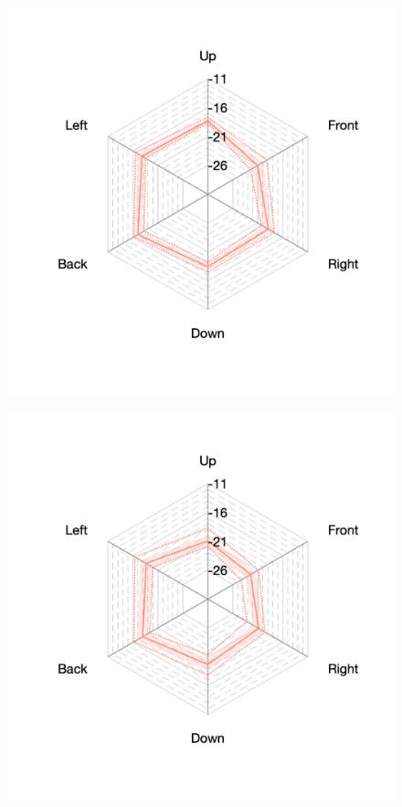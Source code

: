 \documentclass[11pt,a4j]{jreport}
\begin{document}
\begin{figure}[H]
\begin{minipage}[b]{.33\textwidth}
        \label{fig:ホールEにおけるSTEarly}
      \end{minipage}%
      \begin{minipage}[b]{.33\textwidth}
        \centering
        \includegraphics[width=1\linewidth]{images/realHallDirSt/early_hall_f_allpoints.png}
        \label{fig:ホールFにおけるSTEarly}
      \end{minipage}

      \begin{minipage}[b]{.33\textwidth}
        \centering
        \includegraphics[width=1\linewidth]{images/realHallDirSt/early_hall_g_allpoints.png}
        \label{fig:ホールGにおけるSTEarly}
      \end{minipage}


\end{figure}
\end{document}
